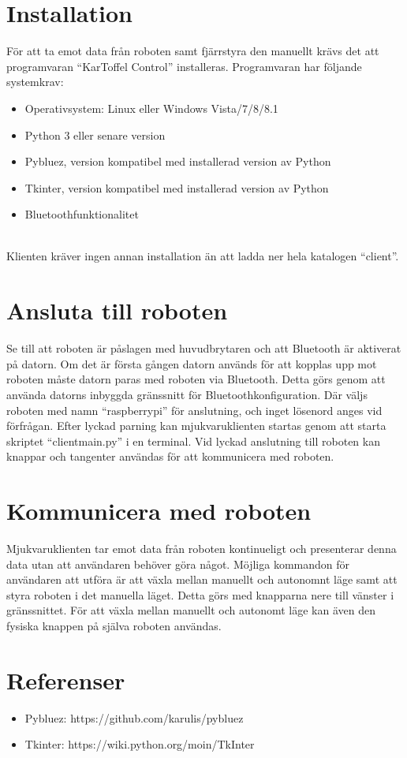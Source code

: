 \documentclass{article}
\begin{document}
\section{Installation}
För att ta emot data från roboten samt fjärrstyra den manuellt krävs det att programvaran ``KarToffel Control'' installeras. Programvaran har följande systemkrav:
\begin{itemize}
    \item Operativsystem: Linux eller Windows Vista/7/8/8.1
    \item Python 3 eller senare version
    \item Pybluez, version kompatibel med installerad version av Python
    \item Tkinter, version kompatibel med installerad version av Python
    \item Bluetoothfunktionalitet
\end{itemize}
\ \\
Klienten kräver ingen annan installation än att ladda ner hela katalogen ``client''.

\clearpage
\section{Ansluta till roboten}
Se till att roboten är påslagen med huvudbrytaren och att Bluetooth är aktiverat på datorn. Om det är första gången datorn används för att kopplas upp mot roboten måste datorn paras med roboten via Bluetooth. Detta görs genom att använda datorns inbyggda gränssnitt för Bluetoothkonfiguration. Där väljs roboten med namn ``raspberrypi'' för anslutning, och inget lösenord anges vid förfrågan. Efter lyckad parning kan mjukvaruklienten startas genom att starta skriptet ``client\textunderscore main.py'' i en terminal. Vid lyckad anslutning till roboten kan knappar och tangenter användas för att kommunicera med roboten. 

\clearpage
\section{Kommunicera med roboten}
Mjukvaruklienten tar emot data från roboten kontinueligt och presenterar denna data utan att användaren behöver göra något.
Möjliga kommandon för användaren att utföra är att växla mellan manuellt och autonomnt läge samt att styra roboten i det manuella läget. Detta görs med knapparna nere till vänster i gränssnittet.
För att växla mellan manuellt och autonomt läge kan även den fysiska knappen på själva roboten användas.

\clearpage
\section{Referenser}
\begin{itemize}
	\item Pybluez: https://github.com/karulis/pybluez
	\item Tkinter: https://wiki.python.org/moin/TkInter
\end{itemize}

\nocite{*}
{}

\end{document}
